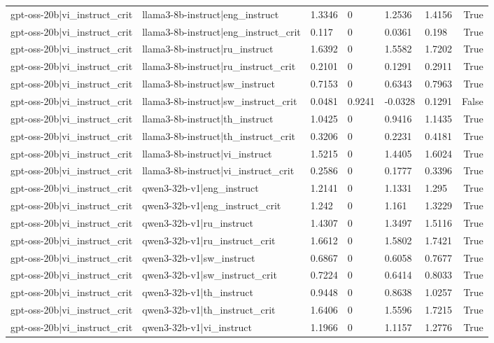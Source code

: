\begin{table}
\begin{tabular}{llllllr}
gpt-oss-20b|vi_instruct_crit & llama3-8b-instruct|eng_instruct & 1.3346 & 0 & 1.2536 & 1.4156 & True \\
gpt-oss-20b|vi_instruct_crit & llama3-8b-instruct|eng_instruct_crit & 0.117 & 0 & 0.0361 & 0.198 & True \\
gpt-oss-20b|vi_instruct_crit & llama3-8b-instruct|ru_instruct & 1.6392 & 0 & 1.5582 & 1.7202 & True \\
gpt-oss-20b|vi_instruct_crit & llama3-8b-instruct|ru_instruct_crit & 0.2101 & 0 & 0.1291 & 0.2911 & True \\
gpt-oss-20b|vi_instruct_crit & llama3-8b-instruct|sw_instruct & 0.7153 & 0 & 0.6343 & 0.7963 & True \\
gpt-oss-20b|vi_instruct_crit & llama3-8b-instruct|sw_instruct_crit & 0.0481 & 0.9241 & -0.0328 & 0.1291 & False \\
gpt-oss-20b|vi_instruct_crit & llama3-8b-instruct|th_instruct & 1.0425 & 0 & 0.9416 & 1.1435 & True \\
gpt-oss-20b|vi_instruct_crit & llama3-8b-instruct|th_instruct_crit & 0.3206 & 0 & 0.2231 & 0.4181 & True \\
gpt-oss-20b|vi_instruct_crit & llama3-8b-instruct|vi_instruct & 1.5215 & 0 & 1.4405 & 1.6024 & True \\
gpt-oss-20b|vi_instruct_crit & llama3-8b-instruct|vi_instruct_crit & 0.2586 & 0 & 0.1777 & 0.3396 & True \\
gpt-oss-20b|vi_instruct_crit & qwen3-32b-v1|eng_instruct & 1.2141 & 0 & 1.1331 & 1.295 & True \\
gpt-oss-20b|vi_instruct_crit & qwen3-32b-v1|eng_instruct_crit & 1.242 & 0 & 1.161 & 1.3229 & True \\
gpt-oss-20b|vi_instruct_crit & qwen3-32b-v1|ru_instruct & 1.4307 & 0 & 1.3497 & 1.5116 & True \\
gpt-oss-20b|vi_instruct_crit & qwen3-32b-v1|ru_instruct_crit & 1.6612 & 0 & 1.5802 & 1.7421 & True \\
gpt-oss-20b|vi_instruct_crit & qwen3-32b-v1|sw_instruct & 0.6867 & 0 & 0.6058 & 0.7677 & True \\
gpt-oss-20b|vi_instruct_crit & qwen3-32b-v1|sw_instruct_crit & 0.7224 & 0 & 0.6414 & 0.8033 & True \\
gpt-oss-20b|vi_instruct_crit & qwen3-32b-v1|th_instruct & 0.9448 & 0 & 0.8638 & 1.0257 & True \\
gpt-oss-20b|vi_instruct_crit & qwen3-32b-v1|th_instruct_crit & 1.6406 & 0 & 1.5596 & 1.7215 & True \\
gpt-oss-20b|vi_instruct_crit & qwen3-32b-v1|vi_instruct & 1.1966 & 0 & 1.1157 & 1.2776 & True \\

\end{tabular}
\end{table}
